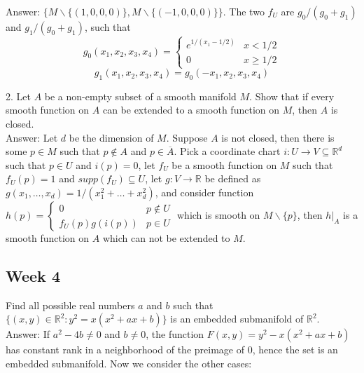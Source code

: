 \documentclass{article}
\theoremstyle{definition}
\begin{document}
Answer: $\{M\backslash \{(1, 0, 0, 0)\}, M\backslash \{(-1, 0, 0, 0)\}\}$. The two $f_U$ are $g_0/(g_0+g_1)$ and $g_1/(g_0+g_1)$, such that
\[g_0(x_1, x_2, x_3, x_4)=\begin{cases}e^{1/(x_1-1/2)} & x<1/2\\ 0 & x\geq 1/2\end{cases}\]
\[g_1(x_1, x_2, x_3, x_4)=g_0(-x_1, x_2, x_3, x_4)\]

2. Let $A$ be a non-empty subset of a smooth manifold $M$. Show that if every smooth function on $A$ can be extended to a smooth function on $M$, then $A$ is closed.\\

Answer: Let $d$ be the dimension of $M$. Suppose $A$ is not closed, then there is some $p\in M$ such that $p\not\in A$ and $p\in\overline{A}$. Pick a coordinate chart $i: U\rightarrow V\subseteq\mathbb{R}^d$ such that $p\in U$ and $i(p)=0$, let $f_U$ be a smooth function on $M$ such that $f_U(p)=1$ and $supp(f_U)\subseteq U$, let $g:V\rightarrow \mathbb{R}$ be defined as $g(x_1, \dots, x_d)=1/(x_1^2+\dots+x_d^2)$, and consider function $h(p)=\begin{cases}0 & p\not\in U\\ f_U(p)g(i(p)) & p\in U\end{cases}$ which is smooth on $M\backslash \{p\}$, then $h|_A$ is a smooth function on $A$ which can not be extended to $M$.

\subsection{Week 4}

Find all possible real numbers $a$ and $b$ such that $\{(x,y)\in\mathbb{R}^2:y^2=x(x^2+ax+b)\}$ is an embedded submanifold of $\mathbb{R}^2$.\\

Answer: If $a^2-4b\not=0$ and $b\not=0$, the function $F(x, y)=y^2-x(x^2+ax+b)$ has constant rank in a neighborhood of the preimage of $0$, hence the set is an embedded submanifold. Now we consider the other cases:
\end{document}
